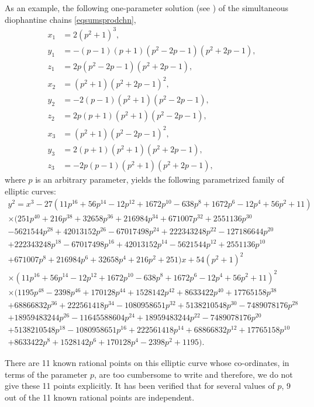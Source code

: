 \documentclass[11pt, leqno]{article}
\begin{document}
As an example, the following one-parameter solution (see \cite[p.\ 93]{ChW}) of the simultaneous diophantine chains \eqref{eqsumsprodchn}, 
\begin{equation} 
\begin{aligned}
x_1 &= 2(p^2+1)^3,\\
y_1 &= -(p - 1)(p + 1)(p^2-2p-1)(p^2+2p-1),\\
z_1 &=  2p(p^2-2p-1)(p^2+2p-1),\\
x_2 &= (p^2+1)(p^2+2p-1)^2,\\
y_2 &= -2(p-1)(p^2+1)(p^2-2p-1),\\
z_2 &= 2p(p+1)(p^2+1)(p^2-2p-1),\\ 
x_3 &=(p^2+1)(p^2-2p-1)^2,\\
y_3 &=  2(p+1)(p^2+1)(p^2+2p-1),\\
z_3 &= -2p(p-1)(p^2+1)(p^2+2p-1),
\end{aligned}
\end{equation}
where $p$ is an arbitrary parameter, yields the following parametrized family of elliptic curves: 
\begin{multline}
y^2= x^3-27(11p^{16}+56p^{14}-12p^{12}+1672p^{10}-638p^8+1672p^6-12p^4+56p^2+11)\\
\times (251p^{40}+216p^{38}+32658p^{36}+216984p^{34}+671007p^{32}+2551136p^{30}\\
-5621544p^{28}+42013152p^{26}-67017498p^{24}+222343248p^{22}-127186644p^{20}\\
+222343248p^{18}-67017498p^{16}+42013152p^{14}-5621544p^{12}+2551136p^{10}\\
+671007p^8+216984p^6+32658p^4+216p^2+251)x+54(p^2+1)^2\\
\times (11p^{16}+56p^{14}-12p^{12}+1672p^{10}-638p^8+1672p^6-12p^4+56p^2+11)^2\\
\times (1195p^{48}-2398p^{46}+170128p^{44}+1528142p^{42}+8633422p^{40}+17765158p^{38}\\
+68866832p^{36}+222561418p^{34}-1080958651p^{32}+5138210548p^{30}-7489078176p^{28}\\
+18959483244p^{26}-11645588604p^{24}+18959483244p^{22}-7489078176p^{20}\\
+5138210548p^{18}-1080958651p^{16}+222561418p^{14}+68866832p^{12}+17765158p^{10}\\
+8633422p^8+1528142p^6+170128p^4-2398p^2+1195). \label{cubicecfamily1}
\end{multline} 

There are 11 known rational points on this elliptic curve whose co-ordinates, in terms of the parameter $p$,  are too cumbersome to write and therefore,  we do not give these 11 points explicitly. It has been verified that for several values of $p$, 9 out of the 11 known rational points are independent. 
\end{document}
